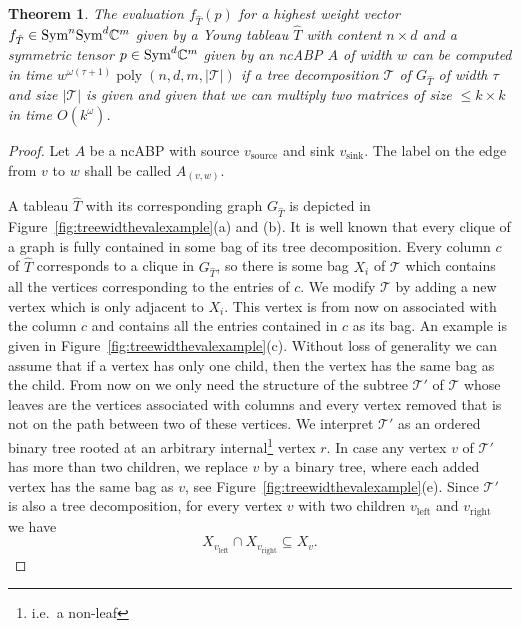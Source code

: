 \documentclass[10pt,a4paper]{article}
\numberwithin{equation}{section}
\newtheorem{theorem}[equation]{Theorem}
\theoremstyle{definition}
\newcommand{\Sym}{\textup{Sym}}
\newcommand{\IC}{\mathbb{C}}
\newcommand{\CT}{\mathcal{T}}
\DeclareMathOperator{\poly}{poly}
\begin{document}
\begin{theorem}
    \label{thm:evaltreewidth}
    The evaluation $f_{\hat T}(p)$ for a highest weight vector $f_{\hat T} \in \Sym^n\Sym^d \IC^m$ given by a Young tableau $\hat{T}$ with content $n \times d$ and  a symmetric tensor $p \in \Sym^d \IC^m$ given by an ncABP $A$ of width $w$ can be computed in time $w^{\omega(\tau+1)}\poly(n,d,m,|\CT|)$ if a tree decomposition $\CT$ of $G_{\hat{T}}$ of width $\tau$ and size $|\CT|$ is given and given that we can multiply two matrices of size $\leq k \times k$ in time $O(k^\omega)$.
\end{theorem}
\begin{proof}
Let $A$ be a ncABP with source $v_\text{source}$ and sink $v_\text{sink}$. The label on the edge from $v$ to $w$ shall be called $A_{(v,w)}$.

A tableau $\hat T$ with its corresponding graph $G_{\hat T}$ is depicted in Figure~\ref{fig:treewidthevalexample}(a) and (b).
It is well known that every clique of a graph is fully contained in some bag of its tree decomposition.
Every column $c$ of $\hat{T}$ corresponds to a clique in $G_{\hat{T}}$, so there is some bag $X_i$ of $\CT$ which contains all the vertices corresponding to the entries of $c$.
We modify $\CT$ by adding a new vertex which is only adjacent to $X_i$.
This vertex is from now on associated with the column $c$ and contains all the entries contained in $c$ as its bag.
An example is given in Figure~\ref{fig:treewidthevalexample}(c).
Without loss of generality we can assume that if a vertex has only one child, then the vertex has the same bag as the child.
From now on we only need the structure of the subtree $\CT'$ of $\CT$ whose leaves are the vertices associated with columns and every vertex removed that is not on the path between two of these vertices.
We interpret $\CT'$ as an ordered binary tree rooted at an arbitrary internal\footnote{i.e.\ a non-leaf} vertex $r$.
In case any vertex $v$ of $\CT'$ has more than two children, we replace $v$ by a binary tree, where each added vertex has the same bag as $v$, see Figure~\ref{fig:treewidthevalexample}(e).
Since $\CT'$ is also a tree decomposition, for every vertex $v$ with two children $v_\text{left}$ and $v_\text{right}$ we have
\begin{equation}\label{eq:treedecompinclusion}
X_{v_\text{left}} \cap X_{v_\text{right}}\subseteq X_v.
\end{equation}


\end{proof}
\end{document}
